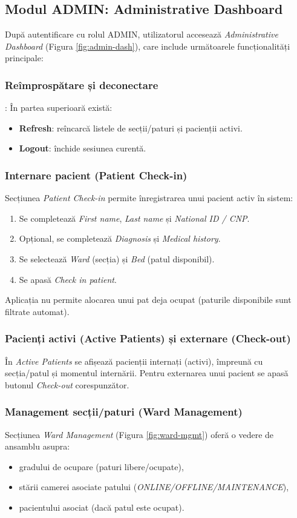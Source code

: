 \subsection*{Modul ADMIN: Administrative Dashboard}
După autentificare cu rolul ADMIN, utilizatorul accesează \textit{Administrative Dashboard} (Figura \ref{fig:admin-dash}), care include următoarele funcționalități principale:

\subsubsection{Reîmprospătare și deconectare}: În partea superioară există:
\begin{itemize}
	\item \textbf{Refresh}: reîncarcă listele de secții/paturi și pacienții activi.
	\item \textbf{Logout}: închide sesiunea curentă.
\end{itemize}

\subsubsection{Internare pacient (Patient Check-in)}
Secțiunea \textit{Patient Check-in} permite înregistrarea unui pacient activ în sistem:
\begin{enumerate}
	\item Se completează \textit{First name}, \textit{Last name} și \textit{National ID / CNP}.
	\item Opțional, se completează \textit{Diagnosis} și \textit{Medical history}.
	\item Se selectează \textit{Ward} (secția) și \textit{Bed} (patul disponibil).
	\item Se apasă \textit{Check in patient}.
\end{enumerate}
Aplicația nu permite alocarea unui pat deja ocupat (paturile disponibile sunt filtrate automat).

\subsubsection{Pacienți activi (Active Patients) și externare (Check-out)}
În \textit{Active Patients} se afișează pacienții internați (activi), împreună cu secția/patul și momentul internării.
Pentru externarea unui pacient se apasă butonul \textit{Check-out} corespunzător.

\subsubsection{Management secții/paturi (Ward Management)}
Secțiunea \textit{Ward Management} (Figura \ref{fig:ward-mgmt}) oferă o vedere de ansamblu asupra:
\begin{itemize}
	\item gradului de ocupare (paturi libere/ocupate),
	\item stării camerei asociate patului (\textit{ONLINE/OFFLINE/MAINTENANCE}),
	\item pacientului asociat (dacă patul este ocupat).
\end{itemize}

